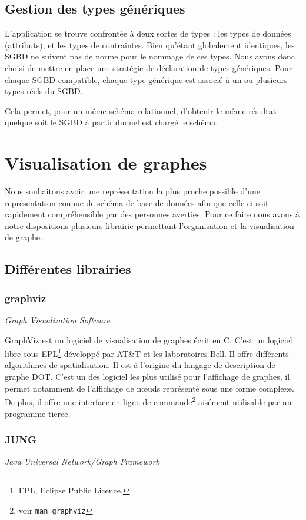 	\subsection{Gestion des types génériques}
	\label{section:generic_types}
	L'application se trouve confrontée à deux sortes de types : les types de données (attributs), et les types de contraintes. Bien qu'étant globalement identiques, les SGBD ne suivent pas de norme pour le nommage de ces types. Nous avons donc choisi de mettre en place une stratégie de déclaration de types génériques. Pour chaque SGBD compatible, chaque type générique est associé à un ou plusieurs types réels du SGBD.
	
	Cela permet, pour un même schéma relationnel, d'obtenir le même résultat quelque soit le SGBD à partir duquel est chargé le schéma.

\section{Visualisation de graphes}
	
	Nous souhaitons avoir une représentation la plus proche possible d'une représentation connue de schéma de base de données afin que celle-ci soit rapidement compréhensible par des personnes averties. Pour ce faire nous avons à notre dispositions plusieurs librairie permettant l'organisation et la visualisation de graphe.

  \subsection{Différentes librairies}
  	\subsubsection{graphviz} \textit{Graph Visualization Software}
  	
			GraphViz est un logiciel de visualisation de graphes écrit en C. C'est un logiciel libre sous EPL\footnote{EPL, Eclipse Public Licence.} développé par AT\&T et les laboratoires Bell. Il offre différents algorithmes de spatialisation. Il est à l'origine du langage de description de graphe DOT. C'est un des logiciel les plus utilisé pour l'affichage de graphes, il permet notamment de l'affichage de nœuds représenté sous une forme complexe. De plus, il offre une interface en ligne de commande\footnote{voir \texttt{man graphviz}} aisément utilisable par un programme tierce.
		\subsubsection{JUNG} \textit{Java Universal Network/Graph Framework}
		
